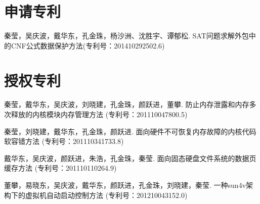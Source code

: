 \begin{resume}
\begin{enumerate}[{[}1{]}]
  \end{enumerate}
  \section*{申请专利} %
  \begin{enumerate}[{[}1{]}]
  \addtolength{\itemsep}{-.36\baselineskip}%
  \item 秦莹，吴庆波，戴华东，孔金珠，杨沙洲、沈胜宇、谭郁松. SAT问题求解外包中的CNF公式数据保护方法(专利号：201410292502.6)
  \end{enumerate}
  \section*{授权专利} %
  \begin{enumerate}[{[}1{]}]
  \addtolength{\itemsep}{-.36\baselineskip}%
  \item 秦莹，戴华东，吴庆波，刘晓建，孔金珠，颜跃进，董攀. 防止内存泄露和内存多次释放的内核模块内存管理方法 (专利号：201110047800.5)
  \item 秦莹，刘晓建，戴华东，孔金珠，颜跃进. 面向硬件不可恢复内存故障的内核代码软容错方法 (专利号：201110341733.8)
  \item 戴华东，吴庆波，颜跃进，朱浩，孔金珠，秦莹. 面向固态硬盘文件系统的数据页缓存方法 (专利号：201110110264.9)
  \item 董攀，易晓东，吴庆波，戴华东，颜跃进，孔金珠，刘晓建，秦莹. 一种sun4v架构下的虚拟机自动启动控制方法 (专利号：201210043152.0)
  \end{enumerate}



\end{resume}
